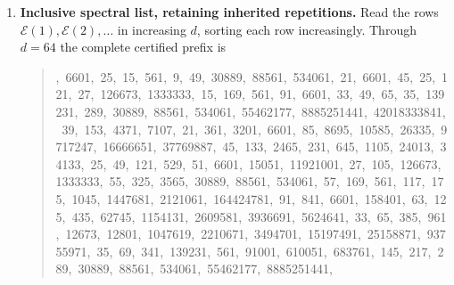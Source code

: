 \documentclass[11pt]{article}
\newcommand{\Eset}{\mathcal E}
\begin{document}
\begin{enumerate}
\item \textbf{Inclusive spectral list, retaining inherited repetitions.}
Read the rows $\Eset(1),\Eset(2),\ldots$ in increasing $d$, sorting each row
increasingly.  Through $d=64$ the complete certified prefix is
\begin{quote}\small{},\allowbreak\ 6601,\allowbreak\ 25,\allowbreak\ 15,\allowbreak\ 561,\allowbreak\ 9,\allowbreak\
49,\allowbreak\ 30889,\allowbreak\ 88561,\allowbreak\ 534061,\allowbreak\ 21,\allowbreak\ 6601,\allowbreak\
45,\allowbreak\ 25,\allowbreak\ 121,\allowbreak\ 27,\allowbreak\ 126673,\allowbreak\ 1333333,\allowbreak\
15,\allowbreak\ 169,\allowbreak\ 561,\allowbreak\ 91,\allowbreak\ 6601,\allowbreak\ 33,\allowbreak\
49,\allowbreak\ 65,\allowbreak\ 35,\allowbreak\ 139231,\allowbreak\ 289,\allowbreak\ 30889,\allowbreak\
88561,\allowbreak\ 534061,\allowbreak\ 55462177,\allowbreak\ 8885251441,\allowbreak\ 42018333841,\allowbreak\
39,\allowbreak\ 153,\allowbreak\ 4371,\allowbreak\ 7107,\allowbreak\ 21,\allowbreak\ 361,\allowbreak\
3201,\allowbreak\ 6601,\allowbreak\ 85,\allowbreak\ 8695,\allowbreak\ 10585,\allowbreak\ 26335,\allowbreak\
9717247,\allowbreak\ 16666651,\allowbreak\ 37769887,\allowbreak\ 45,\allowbreak\ 133,\allowbreak\
2465,\allowbreak\ 231,\allowbreak\ 645,\allowbreak\ 1105,\allowbreak\ 24013,\allowbreak\ 34133,\allowbreak\
25,\allowbreak\ 49,\allowbreak\ 121,\allowbreak\ 529,\allowbreak\ 51,\allowbreak\ 6601,\allowbreak\
15051,\allowbreak\ 11921001,\allowbreak\ 27,\allowbreak\ 105,\allowbreak\ 126673,\allowbreak\
1333333,\allowbreak\ 55,\allowbreak\ 325,\allowbreak\ 3565,\allowbreak\ 30889,\allowbreak\ 88561,\allowbreak\
534061,\allowbreak\ 57,\allowbreak\ 169,\allowbreak\ 561,\allowbreak\ 117,\allowbreak\ 175,\allowbreak\
1045,\allowbreak\ 1447681,\allowbreak\ 2121061,\allowbreak\ 164424781,\allowbreak\ 91,\allowbreak\
841,\allowbreak\ 6601,\allowbreak\ 158401,\allowbreak\ 63,\allowbreak\ 125,\allowbreak\ 435,\allowbreak\
62745,\allowbreak\ 1154131,\allowbreak\ 2609581,\allowbreak\ 3936691,\allowbreak\ 5624641,\allowbreak\
33,\allowbreak\ 65,\allowbreak\ 385,\allowbreak\ 961,\allowbreak\ 12673,\allowbreak\ 12801,\allowbreak\
1047619,\allowbreak\ 2210671,\allowbreak\ 3494701,\allowbreak\ 15197491,\allowbreak\ 25158871,\allowbreak\
93755971,\allowbreak\ 35,\allowbreak\ 69,\allowbreak\ 341,\allowbreak\ 139231,\allowbreak\ 561,\allowbreak\
91001,\allowbreak\ 610051,\allowbreak\ 683761,\allowbreak\ 145,\allowbreak\ 217,\allowbreak\ 289,\allowbreak\
30889,\allowbreak\ 88561,\allowbreak\ 534061,\allowbreak\ 55462177,\allowbreak\ 8885251441,\allowbreak\

\end{quote}
\end{enumerate}
\end{document}
